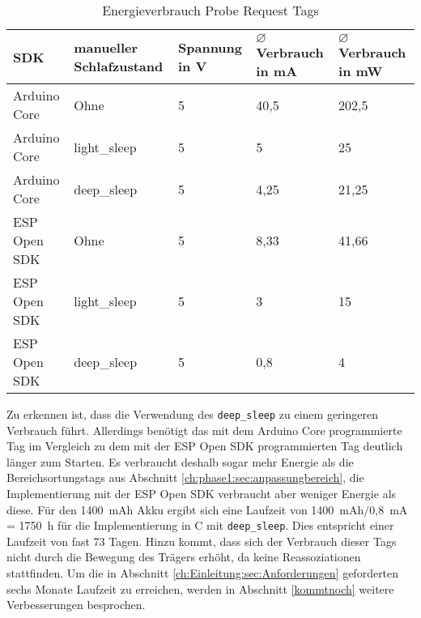 \begin{table}[h]
	\centering
	\caption{Energieverbrauch Probe Request Tags}
	\label{table:probeconsumption}
	\begin{tabular}{p{3cm}|p{2.4cm}|p{2cm}|p{2cm}|p{2cm}}
		SDK & manueller Schlafzustand  & Spannung in V & $\varnothing$ Verbrauch in mA & $\varnothing$ Verbrauch in mW \\
		\hline
		Arduino Core & Ohne & 5 & 40,5 & 202,5 \\
		Arduino Core & light\_sleep & 5 & 5 & 25 \\
		Arduino Core & deep\_sleep & 5 & 4,25 & 21,25 \\
		ESP Open SDK & Ohne & 5 & 8,33 & 41,66 \\
		ESP Open SDK & light\_sleep & 5 & 3 & 15 \\
		ESP Open SDK & deep\_sleep & 5 & 0,8 & 4 \\
	\end{tabular}
\end{table}


Zu erkennen ist, dass die Verwendung des \texttt{deep\_sleep} zu einem geringeren Verbrauch führt. 
Allerdings benötigt das mit dem Arduino Core programmierte Tag im Vergleich zu dem mit der ESP Open SDK programmierten Tag deutlich länger zum Starten.
Es verbraucht deshalb sogar mehr Energie als die Bereichsortungstags aus Abschnitt \ref{ch:phase1:sec:anpassungbereich}, die Implementierung mit der ESP Open SDK verbraucht aber weniger Energie als diese.
Für den 1400\ mAh Akku ergibt sich eine Laufzeit von 1400\ mAh/0,8\ mA = 1750\ h für die Implementierung in C mit \texttt{deep\_sleep}.
Dies entspricht einer Laufzeit von fast 73 Tagen.
Hinzu kommt, dass sich der Verbrauch dieser Tags nicht durch die Bewegung des Trägers erhöht, da keine Reassoziationen stattfinden.
Um die in Abschnitt \ref{ch:Einleitung:sec:Anforderungen} geforderten sechs Monate Laufzeit zu erreichen, werden in Abschnitt \ref{kommtnoch} weitere Verbesserungen besprochen.

